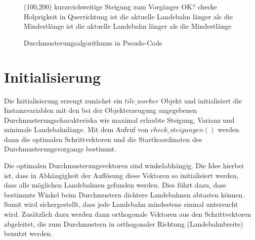 \documentclass[10pt,a4paper]{report}
\begin{document}
\clearpage
\begin{figure}
\begin{struktogramm}(100,200)\label{nasshnlogisch}
{kurzreichweitige Steigung zum Vorgänger OK?}{\sTrue}{\sFalse}
{checke Holprigkeit in Querrichtung}{\sTrue}{\sFalse}
\change
{}
{ist die aktuelle Landebahn länger als die Mindestlänge}{\sTrue}{\sFalse}
\change
{}
\ifend
\ifend
\change
{}
{ist die aktuelle Landebahn länger als die Mindestlänge}{\sTrue}{\sFalse}
\change
{}
\ifend
{}
\ifend
\forallinend
\end{struktogramm}
\caption{Durchmusterungsalgorithmus in Pseudo-Code}
\end{figure}
\clearpage
\section{Initialisierung}

Die Initialisierung erzeugt zunächst ein $tile\_worker$ Objekt und initialisiert die Instanzvariablen mit den bei der Objekterzeugung angegebenen Durchmusterungscharakteriska wie maximal erlaubte Steigung, Varianz und minimale Landebahnlänge.
Mit dem Aufruf von $check\_steigungen()$ werden dann die optimalen Schrittvektoren und die Startkoordinaten des Durchmusterungsvorgangs bestimmt.

Die optimalen Durchmusterungsvektoren sind winkelabhängig. Die Idee hierbei ist, dass in Abhängigkeit der Auflösung diese Vektoren so initialisiert werden, dass alle möglichen Landebahnen gefunden werden. Dies führt dazu, dass bestimmte Winkel beim Durchmustern dichtere Landebahnen abtasten können. Somit wird sichergestellt, dass jede Landebahn mindestens einmal untersucht wird.
Zusätzlich dazu werden dann orthogonale Vektoren aus den Schrittvektoren abgeleitet, die zum Durchmustern in orthogonaler Richtung (Landebahnbreite) benutzt werden.
\end{document}
